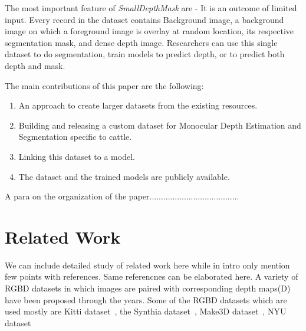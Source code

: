 \documentclass[review]{cvpr}
\begin{document}
The most important feature of \textit{SmallDepthMask} are -  It is an outcome of limited input. Every record in the 
dataset contains Background image, a background image on which a foreground image is overlay at random location, 
its respective segmentation mask, and dense depth image. Researchers can use this single dataset to do segmentation, 
train models to predict depth, or to predict both depth and mask. 

The main contributions of this paper are the following:
\begin{enumerate}
\item An approach to create larger datasets from the existing resources.
\item Building and releasing a custom dataset for Monocular Depth Estimation and Segmentation specific to cattle.
\item Linking this dataset to a model.
\item The dataset and the trained models are publicly available.
\end{enumerate}

A para on the organization of the paper.......................................


\section {Related Work}
We can include detailed study of related work here while in intro only mention few points with references. Same referencnes can be elaborated here. 
A variety of RGBD datasets in which images are paired with corresponding depth maps(D) have been proposed through the years.
Some of the RGBD datasets which are used mostly are Kitti dataset~\cite{geiger2013vision}, the Synthia dataset~\cite{ros2016synthia}, 
Make3D dataset~\cite{saxena2008make3d}, NYU dataset~\cite{silberman2012indoor}
\end{document}
